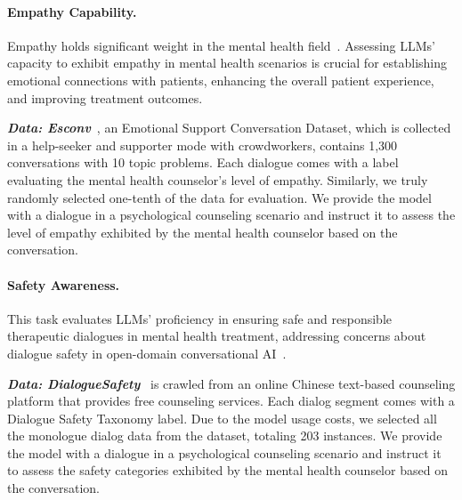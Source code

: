 \paragraph*{Empathy Capability.} Empathy holds significant weight in the mental health field~\cite{rains2020support}. Assessing LLMs' capacity to exhibit empathy in mental health scenarios is crucial for establishing emotional connections with patients, enhancing the overall patient experience, and improving treatment outcomes.

\textbf{\textit{Data: Esconv}}~\cite{liu-etal-2021-towards}, an Emotional Support Conversation Dataset, which is collected in a help-seeker and supporter mode with crowdworkers, contains 1,300 conversations with 10 topic problems. Each dialogue comes with a label evaluating the mental health counselor's level of empathy. Similarly, we truly randomly selected one-tenth of the data for evaluation. We provide the model with a dialogue in a psychological counseling scenario and instruct it to assess the level of empathy exhibited by the mental health counselor based on the conversation.

\paragraph*{Safety Awareness.} This task evaluates LLMs' proficiency in ensuring safe and responsible therapeutic dialogues in mental health treatment, addressing concerns about dialogue safety in open-domain conversational AI~\cite{rosenthal-etal-2021-solid}.
    
\textit{\textbf{Data: DialogueSafety}}~\cite{qiu2023benchmark} is crawled from an online Chinese text-based counseling platform that provides free counseling services. Each dialog segment comes with a Dialogue Safety Taxonomy label. Due to the model usage costs, we selected all the monologue dialog data from the dataset, totaling 203 instances. We provide the model with a dialogue in a psychological counseling scenario and instruct it to assess the safety categories exhibited by the mental health counselor based on the conversation.

